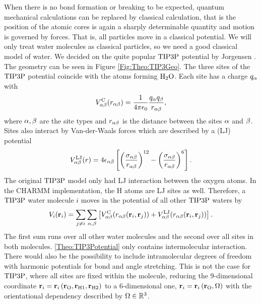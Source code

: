 \documentclass[8.5pt,twoside,twocolumn]{article}
\renewcommand\r{\bo r}
\theoremstyle{standard}
\begin{document}
When there is no bond formation or breaking to be expected, quantum mechanical
calculations can be replaced by classical calculation, that is the position
of the atomic cores is again a sharply determinable quantity and motion
is governed by forces. That is, all particles move in a classical potential.
We will only treat water molecules as classical particles, so we need a good
classical model of water. We decided on the quite popular $\text{TIP3P}$ potential 
by Jorgensen \etal \cite{Jorgensen1983TIP3P}. The geometry can be
seen in Figure \ref{Fig:Theo:TIP3Geo}. The three sites of the $\text{TIP3P}$ potential
coincide with the atoms forming $\text H _2 \text O$. Each site has a charge $q_{\alpha}$ with 
\begin{equation}
V^{\text C}_{\alpha\beta}(r_{\alpha\beta})=\frac{1}{4\pi\epsilon_0}\frac{q_{\alpha}q_{\beta}}{r_{\alpha\beta}},
\label{Theo:TIP3EC}
\end{equation}
where $\alpha,\beta$ are the site types and $r_{\alpha\beta}$ is the distance between
the sites $\alpha$ and $\beta$. Sites also interact by Van-der-Waals forces
which are described by a  (LJ) potential
\newcommand\ELJ{\enmat V^{\te{LJ}}_{\al\be}}
\newcommand\salbe{\enmat{\si_{\al\be}}}
\newcommand\ealbe{\enmat{\eps_{\al\be}}}
\begin{equation}
\ELJ(r)=4\ealbe\ed{\rb{\frac{\salbe}{\ralbe}}^{12}-\rb{\frac{\salbe}{\ralbe}}^{6}}.
\label{Theo:TIP3ELJ}
\end{equation}
The original $\text{TIP3P}$ model only had LJ interaction between the oxygen atoms. In
the CHARMM \cite{CHARMM} implementation, the H atoms are LJ sites as well. Therefore,
a $\text{TIP3P}$ water molecule $i$ moves in the potential of all other $\text{TIP3P}$ waters by
\begin{equation}
V_i(\r_i)=\sum_{j\neq i} \sum_{\al,\be} \ed{\EC(\ralbe(\r_i,\r_j)) + \ELJ(\ralbe(\r_i,\r_j))}.
\label{Theo:TIP3Potential}
\end{equation}
The first sum runs over all other water molecules and the second over all sites in both
molecules. \eqref{Theo:TIP3Potential} only contains intermolecular interaction. There
would also be the possibility to include intramolecular degrees of freedom with
harmonic potentials for bond and angle stretching. This is not the case for $\text{TIP3P}$,
where all sites are fixed within the molecule, reducing the 9-dimensional coordinate
\mbox{$\r_i=\r_i\rb{\r_{\te O},\r_{\te H1},\r_{\te H2}}$} to a 6-dimensional one, \mbox{$\r_i=\r_i\rb{\r_{\te O},\Om}$}
with the orientational dependency described by $\Omega\in\mathbb{R}^3$.
\end{document}
